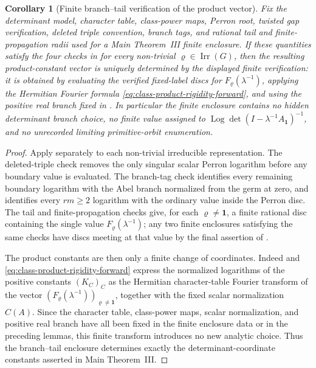 \documentclass[11pt,a4paper]{amsart}
\theoremstyle{plain}
\newtheorem{corollary}[theorem]{Corollary}
\theoremstyle{definition}
\theoremstyle{remark}
\DeclareMathOperator{\Irr}{Irr}
\DeclareMathOperator{\Log}{Log}
\begin{document}
\begin{corollary}[Finite branch--tail verification of the product vector]
  \label{cor:main-iii-branch-tail-certificate-soundness}
  \label{cor:main-iii-branch-tail-enclosure}
  Fix the determinant model, character table, class-power maps, Perron root,
  twisted gap verification, deleted triple convention, branch tags, and rational
  tail and finite-propagation radii used for a Main Theorem~III finite
  enclosure.  If these quantities satisfy the four checks in
   for every non-trivial
  \(\varrho\in\Irr(G)\), then the resulting product-constant vector is uniquely
  determined by the displayed finite verification: it is obtained by evaluating the
  verified fixed-label discs for \(F_\varrho(\lambda^{-1})\), applying the
  Hermitian Fourier formula
  \eqref{eq:class-product-rigidity-forward}, and using the positive real branch
  fixed in .  In particular the
  finite enclosure contains no hidden determinant branch choice, no finite
  value assigned to \(\Log\det(I-\lambda^{-1}A_{\mathbf1})^{-1}\), and no
  unrecorded limiting primitive-orbit enumeration.
\end{corollary}

\begin{proof}
  Apply  separately to each
  non-trivial irreducible representation.  The deleted-triple check removes the
  only singular scalar Perron logarithm before any boundary value is evaluated.
  The branch-tag check identifies every remaining boundary logarithm with the
  Abel branch normalized from the germ at zero, and identifies every
  \(rm\ge2\) logarithm with the ordinary value inside the Perron disc.  The
  tail and finite-propagation checks give, for each \(\varrho\ne\mathbf1\), a
  finite rational disc containing the single value
  \(F_\varrho(\lambda^{-1})\); any two finite enclosures satisfying the same checks have
  discs meeting at that value by the final assertion of
  .

  The product constants are then only a finite change of coordinates.  Indeed
   and
  \eqref{eq:class-product-rigidity-forward} express the normalized logarithms
  of the positive constants \((K_C)_C\) as the Hermitian character-table Fourier
  transform of the vector
  \((F_\varrho(\lambda^{-1}))_{\varrho\ne\mathbf1}\), together with the fixed
  scalar normalization \(C(A)\).  Since the character table, class-power maps,
  scalar normalization, and positive real branch have all been fixed in the
  finite enclosure data or in the preceding lemmas, this finite transform
  introduces no new analytic choice.  Thus the branch--tail enclosure determines
  exactly the determinant-coordinate constants asserted in Main Theorem~III.
\end{proof}
\end{document}
